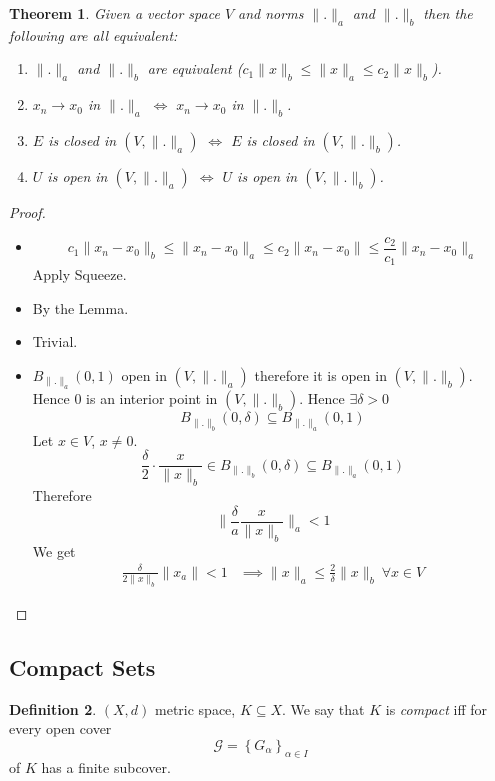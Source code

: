 \documentclass[11pt,a4paper]{article}
\theoremstyle{definition}
\newtheorem{definition}{Definition}[section]
\theoremstyle{plain}
\newtheorem{theorem}[definition]{Theorem}
\theoremstyle{remark}
\renewcommand{\set}[1]{\left\{ #1 \right\}}
\newcommand{\norm}[1]{\lVert #1 \rVert}
\begin{document}
\begin{theorem}
    Given a vector space $V$ and norms $\norm{.}_a$ and $\norm{.}_b$ then the following are all equivalent: 
    \begin{enumerate}
        \item $\norm{.}_a$ and $\norm{.}_b$ are equivalent ($c_1 \norm{x}_b \leq \norm{x}_a \leq c_2 \norm{x}_b$). 
        \item $x_n \to x_0$ in $\norm{.}_a$ $\iff$ $x_n \to x_0$ in $\norm{.}_b$. 
        \item $E$ is closed in $(V, \norm{.}_a)$ $\iff$ $E$ is closed in $(V, \norm{.}_b)$. 
        \item $U$ is open in $(V, \norm{.}_a)$ $\iff$ $U$ is open in $(V, \norm{.}_b)$. 
    \end{enumerate}
\end{theorem}

\begin{proof}
    \begin{itemize}
        \item[$1 \implies 2$] $$c_1 \norm{x_n - x_0}_b \leq \norm{x_n - x_0}_a \leq c_2 \norm{x_n - x_0} \leq \frac{c_2}{c_1} \norm{x_n - x_0}_a$$
        Apply Squeeze. 
        \item[$2 \implies 3$] By the Lemma. 
        \item[$3 \implies 4$] Trivial. 
        \item[$4 \implies 1$] $B_{\norm{.}_a} (0, 1)$ open in $(V, \norm{.}_a)$ therefore it is open in $(V, \norm{.}_b)$. 
        Hence $0$ is an interior point in $(V, \norm{.}_b)$. Hence $\exists \delta > 0$ 
        $$B_{\norm{.}_b} (0, \delta) \subseteq B_{\norm{.}_a} (0, 1)$$
        Let $x \in V$, $x \neq 0$. 
        $$\frac{\delta}{2} \cdot \frac{x}{\norm{x}_b} \in B_{\norm{.}_b}(0, \delta) \subseteq B_{\norm{.}_a} (0,1)$$
        Therefore 
        $$\norm{\frac{\delta}{a} \frac{x}{\norm{x}_b}}_a < 1$$
        We get 
        \begin{align*}
            \frac{\delta}{2 \norm{x}_b} \norm{x_a} < 1 &\implies \norm{x}_a \leq \frac{2}{\delta} \norm{x}_b \ \forall x \in V
        \end{align*}
    \end{itemize}
\end{proof}

\subsection{Compact Sets} 
\begin{definition}
    $(X, d)$ metric space, $K \subseteq X$. We say that $K$ is \emph{compact} iff for every open cover 
    $$\mathcal{G} = \set{G_\alpha}_{\alpha \in I}$$
    of $K$ has a finite subcover. 
\end{definition}
\end{document}
